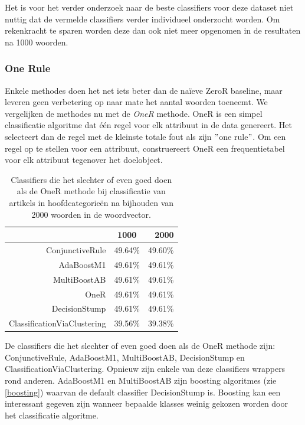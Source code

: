 Het is voor het verder onderzoek naar de beste classifiers voor deze dataset niet nuttig dat de vermelde classifiers verder individueel onderzocht worden. Om rekenkracht te sparen worden deze dan ook niet meer opgenomen in de resultaten na 1000 woorden.

\subsubsection{One Rule}
Enkele methodes doen het net iets beter dan de na\"ieve ZeroR baseline, maar leveren geen verbetering op naar mate het aantal woorden toeneemt. We vergelijken de methodes nu met de \textit{OneR} methode. OneR is een simpel classificatie algoritme dat \'e\'en regel voor elk attribuut in de data genereert. Het selecteert dan de regel met de kleinste totale fout als zijn $"$one rule$"$. Om een regel op te stellen voor een attribuut, construereert OneR een frequentietabel voor elk attribuut tegenover het doelobject.

\begin{table}[htbp]
	\centering
	\caption{Classifiers die het slechter of even goed doen als de OneR methode bij classificatie van artikels in hoofdcategorie\"en na bijhouden van 2000 woorden in de woordvector.}
	\begin{tabular}{rrr}
		\toprule
		& \multicolumn{1}{c}{1000} & 2000 \\
		\midrule
		ConjunctiveRule & \multicolumn{1}{c}{49.64\%} & \multicolumn{1}{c}{49.60\%} \\
		AdaBoostM1 & \multicolumn{1}{c}{49.61\%} & \multicolumn{1}{c}{49.61\%} \\
		MultiBoostAB & \multicolumn{1}{c}{49.61\%} & \multicolumn{1}{c}{49.61\%} \\
		OneR  & \multicolumn{1}{c}{49.61\%} & \multicolumn{1}{c}{49.61\%} \\
		DecisionStump & \multicolumn{1}{c}{49.61\%} & \multicolumn{1}{c}{49.61\%} \\
		ClassificationViaClustering & 39.56\% & \multicolumn{1}{c}{39.38\%} \\
		\bottomrule
	\end{tabular}%
	
	\label{tab:addlabel}%
\end{table}%
 

De classifiers die het slechter of even goed doen als de OneR methode zijn: ConjunctiveRule, AdaBoostM1, MultiBoostAB, DecisionStump en ClassificationViaClustering. Opnieuw zijn enkele van deze classifiers wrappers rond anderen. AdaBoostM1 en MultiBoostAB zijn boosting algoritmes (zie \ref{boosting}) waarvan de default classifier DecisionStump is. Boosting kan een interessant gegeven zijn wanneer bepaalde klasses weinig gekozen worden door het classificatie algoritme.

